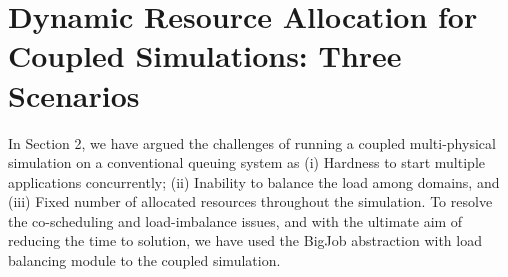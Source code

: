 \documentclass[conference,final]{IEEEtran}
\newcommand{\jhanote}[1]{ {\textcolor{red} { ***Jha: #1 }}}
\newcommand{\jhanote}[1]{}
\begin{document}












\section{Dynamic Resource Allocation for Coupled Simulations: Three Scenarios }

In Section 2, we have argued the challenges of running a coupled
multi-physical simulation on a conventional queuing system as (i)
Hardness to start multiple applications concurrently; (ii) Inability
to balance the load among domains, and (iii) Fixed number of allocated
resources throughout the simulation. To resolve the co-scheduling and
load-imbalance issues, and with the ultimate aim of reducing the time
to solution, we have used the BigJob abstraction with load balancing
module to the coupled simulation.
\end{document}
